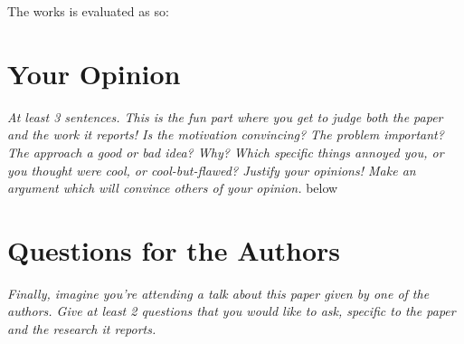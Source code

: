 \documentclass[11pt]{article}
\begin{document}
The works is evaluated as so:


\section*{Your Opinion}

\textsl{At least 3 sentences. This is the fun part where you get to judge both
the paper and the work it reports! Is the motivation convincing? The problem
important? The approach a good or bad idea? Why? Which specific things annoyed
you, or you thought were cool, or cool-but-flawed? Justify your opinions! Make
an argument which will convince others of your opinion.}
below


\section*{Questions for the Authors}

\textsl{Finally, imagine you're attending a talk about this paper given by one
of the authors. Give at least 2 questions that you would like to ask, specific
to the paper and the research it reports.}




\end{document}
